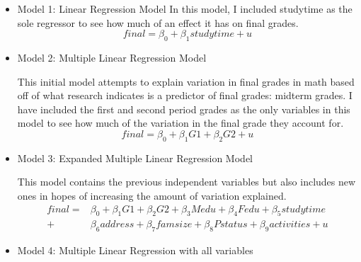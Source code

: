 \documentclass[12pt,english]{article}
\begin{document}
\begin{itemize}

\item Model 1: Linear Regression Model
\label{eq:1}
In this model, I included studytime as the sole regressor to see how much of an effect it has on final grades. 
\begin{equation}
    final = \beta_0 + \beta_1studytime + u
\end{equation}

\item Model 2: Multiple Linear Regression Model

This initial model attempts to explain variation in final grades in math based off of what research indicates is a predictor of final grades: midterm grades. I have included the first and second period grades as the only variables in this model to see how much of the variation in the final grade they account for.
\begin{equation}
    final = \beta_0 + \beta_1G1 + \beta_2G2 + u
\end{equation}

\item Model 3: Expanded Multiple Linear Regression Model

This model contains the previous independent variables but also includes new ones in hopes of increasing the amount of variation explained.
\begin{equation}
\begin{split}
    final = & \beta_0 + \beta_1G1 + \beta_2G2 + \beta_3Medu + \beta_4Fedu + \beta_5studytime \\ + & \beta_6address + \beta_7famsize + \beta_8Pstatus + \beta_9activities + u
\end{split}
\end{equation}

\item Model 4: Multiple Linear Regression with all variables


\end{itemize}
\end{document}
